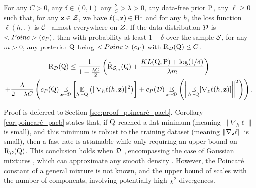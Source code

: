 \begin{corollary}\label{cor:poincaré_pacb}
For any $C>0$, any $\delta\in (0,1)$ any $\frac{2}{C}>\lambda >0$, any data-free prior $\P$, any $\ell\geq 0$ such that, for any $\z\in\Zcal$, we have $\ell(.,\z)\in \mathrm{H}^{1}$ and for any $h$, the loss function $\ell(h,.)$ is $\Ccal^1$ almost everywhere on $\Zcal$.
If the data distribution $\D$ is $\Poinc(c_P)$, then with probability at least $1-\delta$ over the sample $\S$, for any $m>0$, any posterior $\Q$ being $\Poinc(c_P)$ with $\Risk_\D(\Q)\leq C$:

\begin{multline*}
\Risk_{\D}(\Q) \leq \frac{1}{1-\frac{\lambda C}{2}}\LP \hat{\Risk}_{\S_m}(\Q) + \frac{KL(\Q,\P) +\log(1/\delta)}{\lambda m}\RP \\
+ \frac{\lambda}{2-\lambda C}\LP c_{P}(\Q)\EE_{\z\sim\D} \LB \EE_{h\sim \Q}\LP \|\nabla_h \ell(h,\z)\|^2 \RP \RB  + c_{P}(\D)\EE_{\z\sim\D} \LP \LM\EE_{h\sim\Q}[\nabla_z \ell(h,\z)] \RM^2\RP  \RP.
\end{multline*}     
\end{corollary}   
Proof is deferred to Section \ref{sec:proof_poincaré_pacb}.
Corollary \ref{cor:poincaré_pacb} states that, if $\Q$ reached a flat minimum (meaning $\|\nabla_h\ell\|$ is small), and this minimum is robust to the training dataset (meaning $\|\nabla_\z\ell\|$ is small), then a fast rate is attainable while only requiring an upper bound on $\Risk_\D(\Q)$.
This conclusion holds when $\D$ \Poinc, encompassing the case of Gaussian mixtures \citep{schlichting2019poinc}, which can approximate any smooth density \citep[as recalled in][]{gat2022grad}.
However, the Poincaré constant of a general mixture is not known, and the upper bound of \citet{schlichting2019poinc} scales with the number of components, involving potentially high $\chi^2$ divergences.\\

